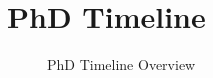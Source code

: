 \chapter{PhD Timeline}

\begin{center}
    \begin{figure}[h!]
        \centering
        
        \caption{PhD Timeline Overview}
        \label{fig:timeline}
    \end{figure}
\end{center}